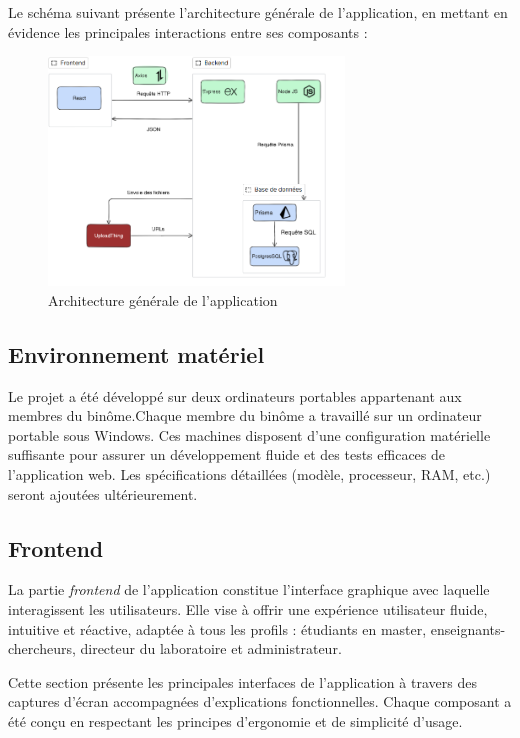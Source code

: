 Le schéma suivant présente l'architecture générale de l’application, en mettant en évidence les principales interactions entre ses composants :

\begin{figure}[H]
  \centering
  \includegraphics[width=0.7\textwidth]{images/architecture.png}
  \caption{Architecture générale de l'application}
  \label{fig:architecture_générale}
\end{figure}

\subsection{Environnement matériel}
Le projet a été développé sur deux ordinateurs portables appartenant aux membres du binôme.Chaque membre du binôme a travaillé sur un ordinateur portable sous Windows. Ces machines disposent d’une configuration matérielle suffisante pour assurer un développement fluide et des tests efficaces de l’application web. Les spécifications détaillées (modèle, processeur, RAM, etc.) seront ajoutées ultérieurement.
\subsection{Frontend}

La partie \textit{frontend} de l’application constitue l’interface graphique avec laquelle interagissent les utilisateurs. Elle vise à offrir une expérience utilisateur fluide, intuitive et réactive, adaptée à tous les profils : étudiants en master, enseignants-chercheurs, directeur du laboratoire et administrateur.

Cette section présente les principales interfaces de l’application à travers des captures d’écran accompagnées d’explications fonctionnelles. Chaque composant a été conçu en respectant les principes d’ergonomie et de simplicité d’usage.

